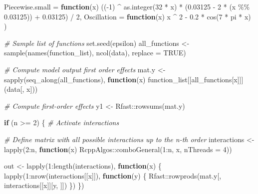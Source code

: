 \documentclass[
  11pt,
]{article}
\newenvironment{Shaded}{\begin{snugshade}}{\end{snugshade}}
\newcommand{\AttributeTok}[1]{\textcolor[rgb]{0.77,0.63,0.00}{#1}}
\newcommand{\CommentTok}[1]{\textcolor[rgb]{0.56,0.35,0.01}{\textit{#1}}}
\newcommand{\ConstantTok}[1]{\textcolor[rgb]{0.00,0.00,0.00}{#1}}
\newcommand{\ControlFlowTok}[1]{\textcolor[rgb]{0.13,0.29,0.53}{\textbf{#1}}}
\newcommand{\DecValTok}[1]{\textcolor[rgb]{0.00,0.00,0.81}{#1}}
\newcommand{\FloatTok}[1]{\textcolor[rgb]{0.00,0.00,0.81}{#1}}
\newcommand{\FunctionTok}[1]{\textcolor[rgb]{0.00,0.00,0.00}{#1}}
\newcommand{\NormalTok}[1]{#1}
\newcommand{\OtherTok}[1]{\textcolor[rgb]{0.56,0.35,0.01}{#1}}
\newcommand{\SpecialCharTok}[1]{\textcolor[rgb]{0.00,0.00,0.00}{#1}}
\begin{document}
\begin{Shaded}
\begin{Highlighting}[]
    \AttributeTok{Piecewise.small =} \ControlFlowTok{function}\NormalTok{(x) ((}\SpecialCharTok{{-}}\DecValTok{1}\NormalTok{) }\SpecialCharTok{\^{}} \FunctionTok{as.integer}\NormalTok{(}\DecValTok{32} \SpecialCharTok{*}\NormalTok{ x) }\SpecialCharTok{*}\NormalTok{ (}\FloatTok{0.03125} \SpecialCharTok{{-}} \DecValTok{2} \SpecialCharTok{*}\NormalTok{ (x }\SpecialCharTok{\%\%} \FloatTok{0.03125}\NormalTok{)) }\SpecialCharTok{+} \FloatTok{0.03125}\NormalTok{) }\SpecialCharTok{/} \DecValTok{2}\NormalTok{,}
    \AttributeTok{Oscillation =} \ControlFlowTok{function}\NormalTok{(x) x }\SpecialCharTok{\^{}} \DecValTok{2} \SpecialCharTok{{-}} \FloatTok{0.2} \SpecialCharTok{*} \FunctionTok{cos}\NormalTok{(}\DecValTok{7} \SpecialCharTok{*}\NormalTok{ pi }\SpecialCharTok{*}\NormalTok{ x)}
\NormalTok{  )}

  \CommentTok{\# Sample list of functions}
  \FunctionTok{set.seed}\NormalTok{(epsilon)}
\NormalTok{  all\_functions }\OtherTok{\textless{}{-}} \FunctionTok{sample}\NormalTok{(}\FunctionTok{names}\NormalTok{(function\_list), }\FunctionTok{ncol}\NormalTok{(data), }\AttributeTok{replace =} \ConstantTok{TRUE}\NormalTok{)}

  \CommentTok{\# Compute model output first order effects}
\NormalTok{  mat.y }\OtherTok{\textless{}{-}} \FunctionTok{sapply}\NormalTok{(}\FunctionTok{seq\_along}\NormalTok{(all\_functions), }\ControlFlowTok{function}\NormalTok{(x)}
\NormalTok{    function\_list[[all\_functions[x]]](data[, x]))}

  \CommentTok{\# Compute first{-}order effects}
\NormalTok{  y1 }\OtherTok{\textless{}{-}}\NormalTok{ Rfast}\SpecialCharTok{::}\FunctionTok{rowsums}\NormalTok{(mat.y)}

  \ControlFlowTok{if}\NormalTok{ (n }\SpecialCharTok{\textgreater{}=} \DecValTok{2}\NormalTok{) \{ }\CommentTok{\# Activate interactions}

    \CommentTok{\# Define matrix with all possible interactions up to the n{-}th order}
\NormalTok{    interactions }\OtherTok{\textless{}{-}} \FunctionTok{lapply}\NormalTok{(}\DecValTok{2}\SpecialCharTok{:}\NormalTok{n, }\ControlFlowTok{function}\NormalTok{(x) RcppAlgos}\SpecialCharTok{::}\FunctionTok{comboGeneral}\NormalTok{(}\DecValTok{1}\SpecialCharTok{:}\NormalTok{n, x, }\AttributeTok{nThreads =} \DecValTok{4}\NormalTok{))}

\NormalTok{    out }\OtherTok{\textless{}{-}} \FunctionTok{lapply}\NormalTok{(}\DecValTok{1}\SpecialCharTok{:}\FunctionTok{length}\NormalTok{(interactions), }\ControlFlowTok{function}\NormalTok{(x) \{}
      \FunctionTok{lapply}\NormalTok{(}\DecValTok{1}\SpecialCharTok{:}\FunctionTok{nrow}\NormalTok{(interactions[[x]]), }\ControlFlowTok{function}\NormalTok{(y) \{}
\NormalTok{        Rfast}\SpecialCharTok{::}\FunctionTok{rowprods}\NormalTok{(mat.y[, interactions[[x]][y, ]])}
\NormalTok{      \})}
\NormalTok{    \})}


\end{Highlighting}
\end{Shaded}
\end{document}
